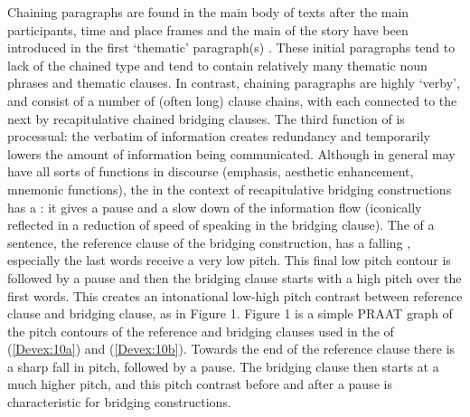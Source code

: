 \documentclass[output=paper]{LSP/langsci}
\begin{document}
Chaining paragraphs are found in the main body of  texts after  the main participants, time and place frames and the main  of the story have been introduced in the first `thematic' paragraph(s) \citep[][369]{devries.2005}. These initial paragraphs tend to lack  of the chained type and tend to contain relatively many thematic noun phrases and thematic clauses. In contrast, chaining paragraphs are highly `verby', and consist of a number of (often long) clause chains, with each  connected to the next by recapitulative chained bridging clauses. The third function of  is processual: the verbatim   of information creates redundancy and temporarily lowers the amount of information being communicated. Although  in general may have all sorts of functions in discourse (emphasis, aesthetic enhancement, mnemonic functions), the  in the context of recapitulative bridging constructions has a : it gives a pause and a slow down of the information flow (iconically reflected in a reduction of speed of speaking in the bridging clause). The  of a sentence, the reference clause of the bridging construction, has a falling , especially the last words receive a very low pitch. This final low pitch contour is followed by a pause and then the bridging clause starts with a high pitch over the first words. This creates an intonational low-high pitch contrast between reference clause and bridging clause, as in Figure 1. Figure 1 is a simple PRAAT graph of the pitch contours of the reference and bridging clauses used in the  of (\ref{Devex:10a}) and (\ref{Devex:10b}). Towards the end of the reference clause there is a sharp fall in pitch, followed by a pause. The bridging clause then starts at a much higher pitch, and this pitch contrast before and after a pause is characteristic for bridging constructions.
\end{document}
